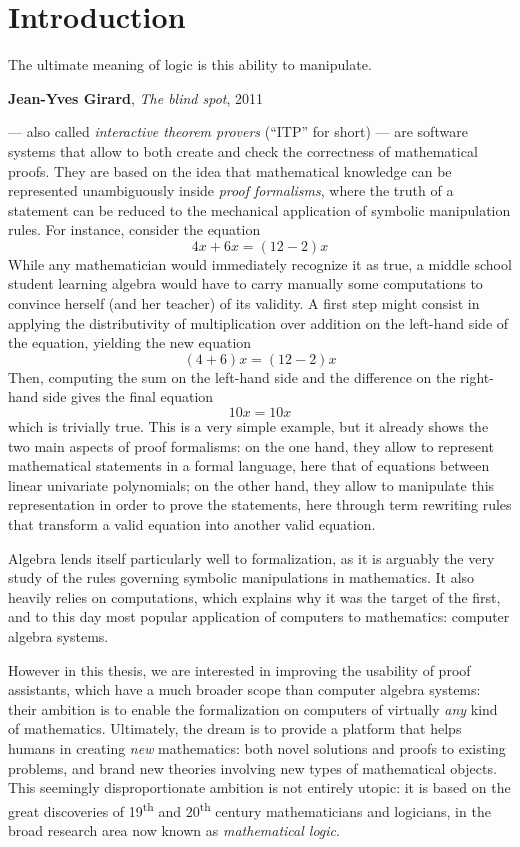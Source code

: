 \setchapterpreamble[u]{\margintoc}
\chapter{Introduction}

\epigraph{The ultimate meaning of logic is this ability to manipulate.}
{\textbf{Jean-Yves Girard}, \textit{The blind spot}, 2011}


 --- also called \emph{interactive theorem provers}
(``ITP'' for short) --- are software systems that allow to both create and check
the correctness of mathematical proofs. They are based on the idea that
mathematical knowledge can be represented unambiguously inside \emph{proof
formalisms}, where the truth of a statement can be reduced to the mechanical
application of symbolic manipulation rules. For instance, consider the equation
$$4x + 6x = (12 - 2)x$$ 
While any mathematician would immediately recognize it as true, a middle school
student learning algebra would have to carry manually some computations to
convince herself (and her teacher) of its validity. A first step might consist
in applying the distributivity of multiplication over addition on the left-hand
side of the equation, yielding the new equation
$$(4 + 6)x = (12 - 2)x$$
Then, computing the sum on the left-hand side and the difference on the
right-hand side gives the final equation
$$10x = 10x$$
which is trivially true. This is a very simple example, but it already shows the
two main aspects of proof formalisms: on the one hand, they allow to represent
mathematical statements in a formal language, here that of equations between
linear univariate polynomials; on the other hand, they allow to manipulate
this representation in order to prove the statements, here through term
rewriting rules that transform a valid equation into another valid equation.

Algebra lends itself particularly well to formalization, as it is arguably the
very study of the rules governing symbolic manipulations in mathematics. It also
heavily relies on computations, which explains why it was the target of the
first, and to this day most popular application of computers to mathematics:
computer algebra systems.

However in this thesis, we are interested in improving the usability of proof
assistants, which have a much broader scope than computer algebra systems: their
ambition is to enable the formalization on computers of virtually \emph{any}
kind of mathematics. Ultimately, the dream is to provide a platform that helps
humans in creating \emph{new} mathematics: both novel solutions and proofs to
existing problems, and brand new theories involving new types of mathematical
objects. This seemingly disproportionate ambition is not entirely utopic: it is
based on the great discoveries of 19\textsuperscript{th} and
20\textsuperscript{th} century mathematicians and logicians, in the broad
research area now known as \emph{mathematical logic}.

